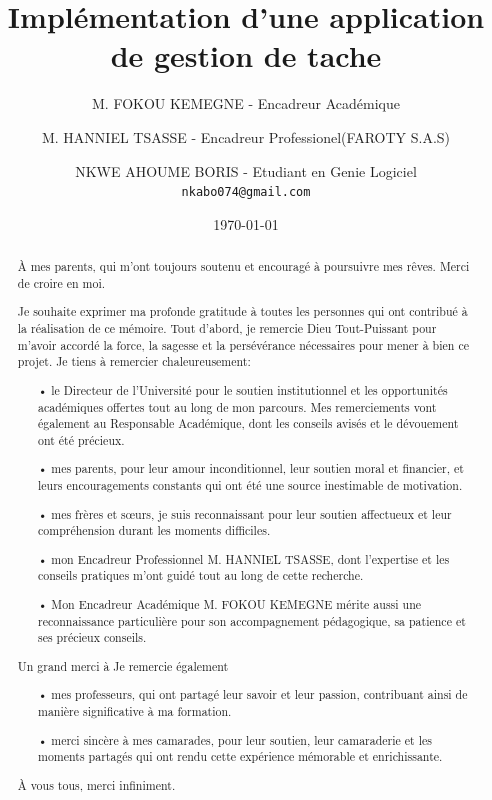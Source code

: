 \documentclass[a4paper,12pt]{report}
\title{Implémentation d'une application de gestion de tache}
\author{
  M. FOKOU KEMEGNE - Encadreur Académique\\
  \and
  M. HANNIEL TSASSE - Encadreur Professionel(FAROTY S.A.S)\\
  \and
  NKWE AHOUME BORIS - Etudiant en Genie Logiciel\\
  \texttt{nkabo074@gmail.com}
}
\date{\today}
\begin{document}
\maketitle

\def\chaptername{Chapitre}%
\def\listfigurename{Liste des figures}
\def\contentsname{Somaire}


\renewcommand{\abstractname}{Dedicace}
\begin{abstract}
À mes parents, qui m'ont toujours soutenu et encouragé à poursuivre mes rêves. Merci de croire en moi.
\end{abstract}

\renewcommand{\abstractname}{Remerciment}
\begin{abstract}
Je souhaite exprimer ma profonde gratitude à toutes les personnes qui ont contribué à la réalisation de ce mémoire. Tout d'abord, je remercie Dieu Tout-Puissant pour m'avoir accordé la force, la sagesse et la persévérance nécessaires pour mener à bien ce projet.
Je tiens à remercier chaleureusement:

\begin{itemize}
  \item[•] le Directeur de l'Université pour le soutien institutionnel et les opportunités académiques offertes tout au long de mon parcours. Mes remerciements vont également au Responsable Académique, dont les conseils avisés et le dévouement ont été précieux.
  \item[•] mes parents, pour leur amour inconditionnel, leur soutien moral et financier, et leurs encouragements constants qui ont été une source inestimable de motivation.
  \item[•] mes frères et sœurs, je suis reconnaissant pour leur soutien affectueux et leur compréhension durant les moments difficiles.
  \item[•] mon Encadreur Professionnel M. HANNIEL TSASSE, dont l'expertise et les conseils pratiques m'ont guidé tout au long de cette recherche. 
  \item[•]Mon Encadreur Académique M. FOKOU KEMEGNE mérite aussi une reconnaissance particulière pour son accompagnement pédagogique, sa patience et ses précieux conseils.
\end{itemize}

Un grand merci à 
Je remercie également

\begin{itemize}
  \item[•] mes professeurs, qui ont partagé leur savoir et leur passion, contribuant ainsi de manière significative à ma formation.
  \item[•] merci sincère à mes camarades, pour leur soutien, leur camaraderie et les moments partagés qui ont rendu cette expérience mémorable et enrichissante.
\end{itemize}

À vous tous, merci infiniment.
\end{abstract}
\end{document}
